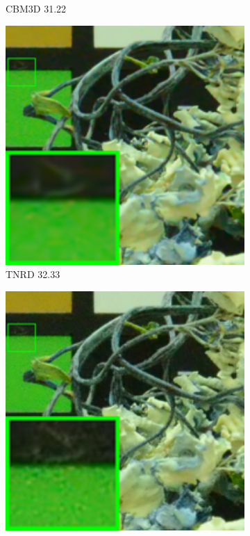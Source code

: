 \begin{figure}
\begin{subfigure}[t]{0.19\textwidth}
		\caption{CBM3D 31.22}
    \end{subfigure}
    \hfill
    \begin{subfigure}[t]{0.19\textwidth}
        \centering
        \includegraphics[width=1\textwidth]{images/mcwnnm/cc/resize_br_TRD_CC15_d800_iso6400_2.png}
\caption{TNRD 32.33}
    \end{subfigure}
    \hfill
    \begin{subfigure}[t]{0.19\textwidth}
        \centering
        \includegraphics[width=1\textwidth]{images/mcwnnm/cc/resize_br_NI_CC15_d800_iso6400_2.png}

\end{subfigure}
\end{figure}

